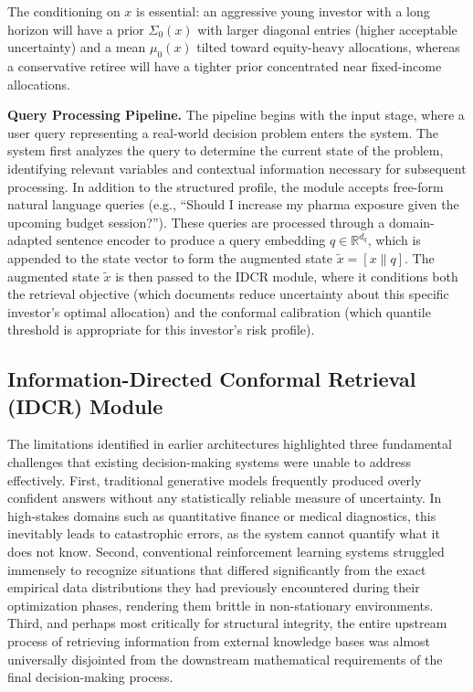 \documentclass[12pt,a4paper,oneside]{report}
\theoremstyle{definition}
\theoremstyle{remark}
\begin{document}
The conditioning on $x$ is essential: an aggressive young investor with a long horizon will have a prior $\Sigma_0(x)$ with larger diagonal entries (higher acceptable uncertainty) and a mean $\mu_0(x)$ tilted toward equity-heavy allocations, whereas a conservative retiree will have a tighter prior concentrated near fixed-income allocations.

\medskip
\noindent\textbf{Query Processing Pipeline.}
The pipeline begins with the input stage, where a user query representing a real-world decision problem enters the system. The system first analyzes the query to determine the current state of the problem, identifying relevant variables and contextual information necessary for subsequent processing. In addition to the structured profile, the module accepts free-form natural language queries (e.g., ``Should I increase my pharma exposure given the upcoming budget session?''). These queries are processed through a domain-adapted sentence encoder to produce a query embedding $q \in \mathbb{R}^{d_q}$, which is appended to the state vector to form the augmented state $\tilde{x} = [x \| q]$. The augmented state $\tilde{x}$ is then passed to the IDCR module, where it conditions both the retrieval objective (which documents reduce uncertainty about this specific investor's optimal allocation) and the conformal calibration (which quantile threshold is appropriate for this investor's risk profile).

\subsection{Information-Directed Conformal Retrieval (IDCR) Module}
The limitations identified in earlier architectures highlighted three fundamental challenges that existing decision-making systems were unable to address effectively. First, traditional generative models frequently produced overly confident answers without any statistically reliable measure of uncertainty. In high-stakes domains such as quantitative finance or medical diagnostics, this inevitably leads to catastrophic errors, as the system cannot quantify what it does not know. Second, conventional reinforcement learning systems struggled immensely to recognize situations that differed significantly from the exact empirical data distributions they had previously encountered during their optimization phases, rendering them brittle in non-stationary environments. Third, and perhaps most critically for structural integrity, the entire upstream process of retrieving information from external knowledge bases was almost universally disjointed from the downstream mathematical requirements of the final decision-making process.
\end{document}
